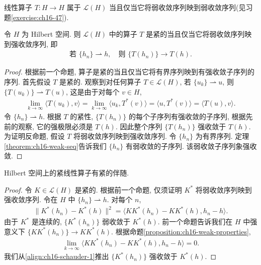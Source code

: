 \documentclass[../../main.tex]{subfiles}
\begin{document}
线性算子 $T:H\to H$ 属于 $\mathcal{L}(H)$ 当且仅当它将弱收敛序列映到弱收敛序列(见习题\cref{exercise:ch16-47}).

\begin{proposition}\label{proposition:ch16-compact-weak-strong}
令 $H$ 为 Hilbert 空间. 则 $\mathcal{L}(H)$ 中的算子 $T$ 是紧的当且仅当它将弱收敛序列映到强收敛序列, 即
\begin{align*}
\text{若 }\{h_{n}\}\rightharpoonup h,\quad\text{则 }\{T(h_{n})\}\to T(h).
\end{align*}
\end{proposition}

\begin{proof}
根据前一个命题, 算子是紧的当且仅当它将有界序列映到有强收敛子序列的序列. 首先假设 $T$ 是紧的. 观察到对任何算子 $T\in\mathcal{L}(H)$, 若 $\{u_{k}\}\rightharpoonup u$, 则 $\{T(u_{k})\}\rightharpoonup T(u)$, 这是由于对每个 $v\in H$,
\begin{align*}
\lim_{k\to\infty}\langle T(u_{k}),v\rangle=\lim_{k\to\infty}\langle u_{k},T^{*}(v)\rangle=\langle u,T^{*}(v)\rangle=\langle T(u),v\rangle.
\end{align*}
令 $\{h_{n}\}\rightharpoonup h$. 根据 $T$ 的紧性, $\{T(h_{n})\}$ 的每个子序列有强收敛的子序列, 根据先前的观察, 它的强极限必须是 $T(h)$. 因此整个序列 $\{T(h_{n})\}$ 强收敛于 $T(h)$. 为证明反命题, 假设 $T$ 将弱收敛序列映到强收敛序列. 令 $\{h_{n}\}$ 为有界序列. 定理\cref{theorem:ch16-weak-seq}告诉我们 $\{h_{n}\}$ 有弱收敛的子序列. 该弱收敛子序列象强收敛.
\end{proof}

\begin{theorem}[Schauder]\label{theorem:ch16-schauder}
Hilbert 空间上的紧线性算子有紧的伴随.
\end{theorem}

\begin{proof}
令 $K\in\mathcal{L}(H)$ 是紧的. 根据前一个命题, 仅须证明 $K^{*}$ 将弱收敛序列映到强收敛序列. 令在 $H$ 中 $\{h_{n}\}\rightharpoonup h$. 对每个 $n$,
\begin{align}
\|K^{*}(h_{n})-K^{*}(h)\|^{2}=\langle KK^{*}(h_{n})-KK^{*}(h),h_{n}-h\rangle.\label{align:ch16-schauder-1}
\end{align}
由于 $K^{*}$ 是连续的, $\{K^{*}(h_{n})\}$ 弱收敛于 $K^{*}(h)$. 前一个命题告诉我们在 $H$ 中强意义下 $\{KK^{*}(h_{n})\}\to KK^{*}(h)$. 根据命题\cref{proposition:ch16-weak-properties},
\begin{align*}
\lim_{k\to\infty}\langle KK^{*}(h_{n})-KK^{*}(h),h_{n}-h\rangle=0.
\end{align*}
我们从\eqref{align:ch16-schauder-1}推出 $\{K^{*}(h_{n})\}$ 强收敛于 $K^{*}(h)$.
\end{proof}
\end{document}
